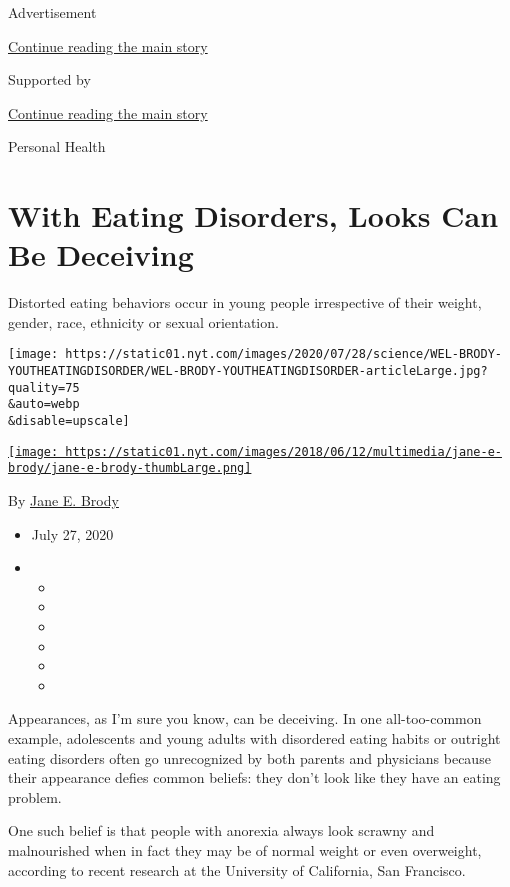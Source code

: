 Advertisement

\protect\hyperlink{after-top}{Continue reading the main story}

Supported by

\protect\hyperlink{after-sponsor}{Continue reading the main story}

Personal Health

\hypertarget{with-eating-disorders-looks-can-be-deceiving}{%
\section{With Eating Disorders, Looks Can Be
Deceiving}\label{with-eating-disorders-looks-can-be-deceiving}}

Distorted eating behaviors occur in young people irrespective of their
weight, gender, race, ethnicity or sexual orientation.

\texttt{[image: https://static01.nyt.com/images/2020/07/28/science/WEL-BRODY-YOUTHEATINGDISORDER/WEL-BRODY-YOUTHEATINGDISORDER-articleLarge.jpg?quality=75\\\&auto=webp\\\&disable=upscale]}

\href{https://www.nytimes.com/by/jane-e-brody}{\texttt{[image: https://static01.nyt.com/images/2018/06/12/multimedia/jane-e-brody/jane-e-brody-thumbLarge.png]}}

By \href{https://www.nytimes.com/by/jane-e-brody}{Jane E. Brody}

\begin{itemize}
\item
  July 27, 2020
\item
  \begin{itemize}
  \item
  \item
  \item
  \item
  \item
  \item
  \end{itemize}
\end{itemize}

Appearances, as I'm sure you know, can be deceiving. In one
all-too-common example, adolescents and young adults with disordered
eating habits or outright eating disorders often go unrecognized by both
parents and physicians because their appearance defies common beliefs:
they don't look like they have an eating problem.

One such belief is that people with anorexia always look scrawny and
malnourished when in fact they may be of normal weight or even
overweight, according to recent research at the University of
California, San Francisco.

